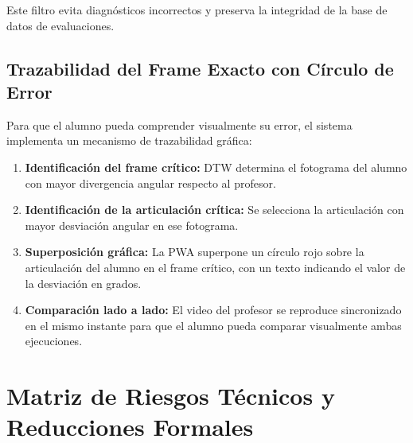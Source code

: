 \documentclass[12pt,letterpaper]{article}
\begin{document}
Este filtro evita diagnósticos incorrectos y preserva la integridad de la base de datos de evaluaciones.

\subsection{Trazabilidad del Frame Exacto con Círculo de Error}

Para que el alumno pueda comprender visualmente su error, el sistema implementa un mecanismo de trazabilidad gráfica:

\begin{enumerate}
    \item \textbf{Identificación del frame crítico:} DTW determina el fotograma del alumno con mayor divergencia angular respecto al profesor.
    \item \textbf{Identificación de la articulación crítica:} Se selecciona la articulación con mayor desviación angular en ese fotograma.
    \item \textbf{Superposición gráfica:} La PWA superpone un círculo rojo sobre la articulación del alumno en el frame crítico, con un texto indicando el valor de la desviación en grados.
    \item \textbf{Comparación lado a lado:} El video del profesor se reproduce sincronizado en el mismo instante para que el alumno pueda comparar visualmente ambas ejecuciones.
\end{enumerate}

\section{Matriz de Riesgos Técnicos y Reducciones Formales}
\end{document}
